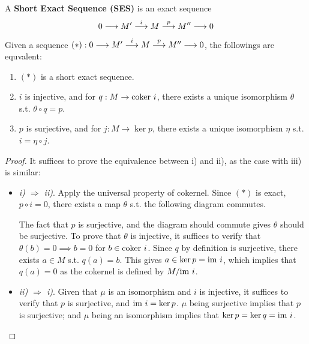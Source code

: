 \begin{definition}
    A \textbf{Short Exact Sequence (SES)} is an exact sequence
    \[
        0 \longrightarrow M' \overset{i}{\longrightarrow} M \overset{p}{\longrightarrow} M'' \longrightarrow 0
    \]
\end{definition}

\begin{proposition}
    Given a sequence $(\ast): 0 \longrightarrow M' \overset{i}{\longrightarrow} M \overset{p}{\longrightarrow} M'' \longrightarrow 0$, the followings are equvalent:
    \begin{enumerate}[label=\roman*)]
        \item $(\ast)$ is a short exact sequence.
        \item $i$ is injective, and for $q: M \to \mathrm{coker}\  i$, there exists a unique isomorphism $\theta$ s.t. $\theta \circ q = p$.
        \item $p$ is surjective, and for $j: M \to \ker p$, there exists a unique isomorphism $\eta$ s.t. $i = \eta \circ j$.
    \end{enumerate}
\end{proposition}

\begin{proof}
    It suffices to prove the equivalence between i) and ii), as the case with iii) is similar:
    \begin{itemize}
        \item \emph{i) $\Rightarrow$ ii)}. Apply the universal property of cokernel. Since $(\ast)$ is exact, $p \circ i = 0$, there exists a map $\theta$ s.t. the following diagram commutes.
        \begin{figure}[htbp]
            \centering
        \end{figure}
        The fact that $p$ is surjective, and the diagram should commute gives $\theta$ should be surjective. To prove that $\theta$ is injective, it suffices to verify that $\theta(b) = 0 \implies b = 0$ for $b \in \mathrm{coker}\  i$. Since $q$ by definition is surjective, there exists $a \in M$ s.t. $q(a) = b$. This gives $a \in \ker p = \mathrm{im}\  i$, which implies that $q(a) = 0$ as the cokernel is defined by $M/ \mathrm{im}\  i$.
        \item \emph{ii) $\Rightarrow$ i)}. Given that $\mu$ is an isomorphism and $i$ is injective, it suffices to verify that $p$ is surjective, and $\mathrm{im}\  i = \ker p$. $\mu$ being surjective implies that $p$ is surjective; and $\mu$ being an isomorphism implies that $\ker p = \ker q = \mathrm{im}\  i$. 
    \end{itemize}
\end{proof}

